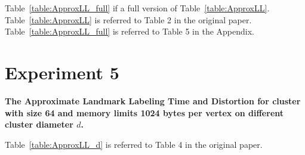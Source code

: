 \documentclass{article}
\begin{document}
Table~\ref{table:ApproxLL_full} if a full version of Table~\ref{table:ApproxLL}.  Table~\ref{table:ApproxLL} is referred to Table 2 in the original paper. Table~\ref{table:ApproxLL_full} is referred to Table 5 in the Appendix.

\section{Experiment 5}

\begin{table}[htbp]
  \centering
  \footnotesize
  
  \caption{
    \small\textbf{The Approximate Landmark Labeling Time and Distortion for cluster with size 64 and memory limits 1024 bytes per vertex on different cluster diameter $d$.} 
    \label{table:ApproxLL_d}
  }
\end{table}

Table~\ref{table:ApproxLL_d} is referred to Table 4 in the original paper. 
\end{document}
